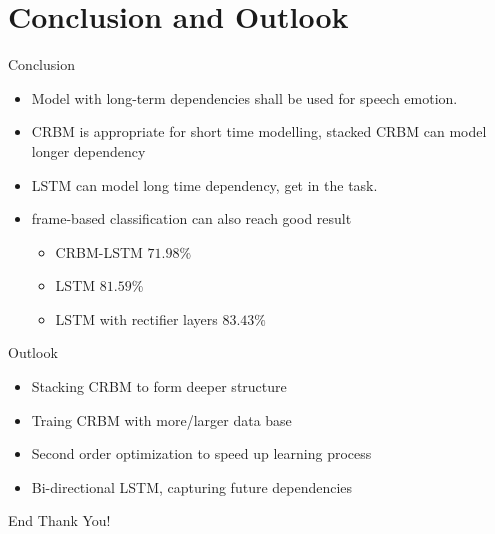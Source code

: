 


\section{Conclusion and Outlook}
      \begin{frame}[t]{Conclusion}
	  \begin{itemize}
	  \item Model with long-term dependencies shall be used for speech emotion.
	  \item CRBM is appropriate for short time modelling, stacked CRBM can model longer dependency
	  \item LSTM can model long time dependency, get in the task. 
	  \item frame-based classification can also reach good result
		\begin{itemize}
		 \item CRBM-LSTM $71.98\%$
		 \item LSTM $81.59\%$
		 \item LSTM with rectifier layers $83.43\%$
		\end{itemize}
	  \end{itemize}
      \end{frame}
      
      \begin{frame}[t]{Outlook}
	  \begin{itemize}
	   \item Stacking CRBM to form deeper structure
	   \item Traing CRBM with more/larger data base 
	   \item Second order optimization to speed up learning process
	   \item Bi-directional LSTM, capturing future dependencies
	  \end{itemize}

      \end{frame}

      \begin{frame}{End}
      \raggedcenter \Large Thank You!
      \end{frame}




